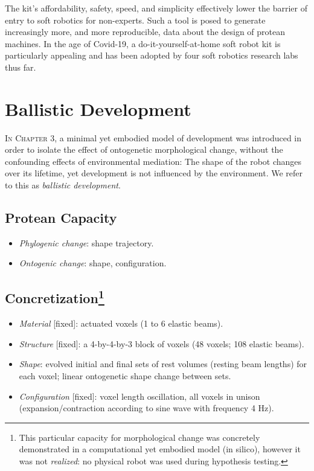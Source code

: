 The kit's affordability, safety, speed, and simplicity effectively lower the barrier of entry to soft robotics for non-experts.
Such a tool is posed to generate increasingly more, and more reproducible, data about the design of protean machines.
In the age of Covid-19, a do-it-yourself-at-home soft robot kit 
is particularly appealing and has been adopted by four soft robotics research labs thus far.



\section{Ballistic Development}


\textsc{In Chapter 3,}
a minimal yet embodied model of development was introduced in order to isolate the effect of ontogenetic morphological change,
without the confounding effects of environmental mediation:
The shape of the
robot changes over its lifetime, yet development is not influenced
by the environment.
We refer to this as \textit{ballistic development}.


\subsection{Protean Capacity}

\begin{itemize}
    \item \textit{Phylogenic change}: shape trajectory.
    \item \textit{Ontogenic change}: shape, configuration.
\end{itemize}


\subsection[Concretization]{Concretization\footnote{This particular capacity for morphological change was concretely demonstrated in a computational yet embodied model (in silico), however it was not \textit{realized}: no physical robot was used during hypothesis testing.}}

\begin{itemize}
    \item \textit{Material} [fixed]: actuated voxels (1 to 6 elastic beams).
    \item \textit{Structure} [fixed]: a 4-by-4-by-3 block of voxels (48 voxels; 108 elastic beams).
    \item \textit{Shape}: evolved initial and final sets of rest volumes (resting beam lengths) for each voxel; linear ontogenetic shape change between sets.
    \item \textit{Configuration} [fixed]: voxel length oscillation, all voxels in unison (expansion/contraction according to sine wave with frequency 4 Hz).
\end{itemize}


